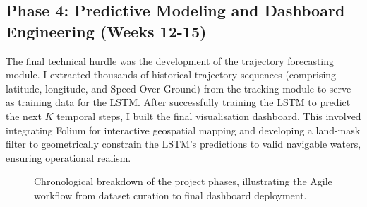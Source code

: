 \subsection{Phase 4: Predictive Modeling and Dashboard Engineering (Weeks 12-15)}
The final technical hurdle was the development of the trajectory forecasting module. I extracted thousands of historical trajectory sequences (comprising latitude, longitude, and Speed Over Ground) from the tracking module to serve as training data for the LSTM. After successfully training the LSTM to predict the next $K$ temporal steps, I built the final visualisation dashboard. This involved integrating Folium for interactive geospatial mapping and developing a land-mask filter to geometrically constrain the LSTM's predictions to valid navigable waters, ensuring operational realism.

\begin{figure}[htb]
\centering
	\caption{Chronological breakdown of the project phases, illustrating the Agile workflow from dataset curation to final dashboard deployment.}
	\label{fig:task_timeline}
\end{figure}